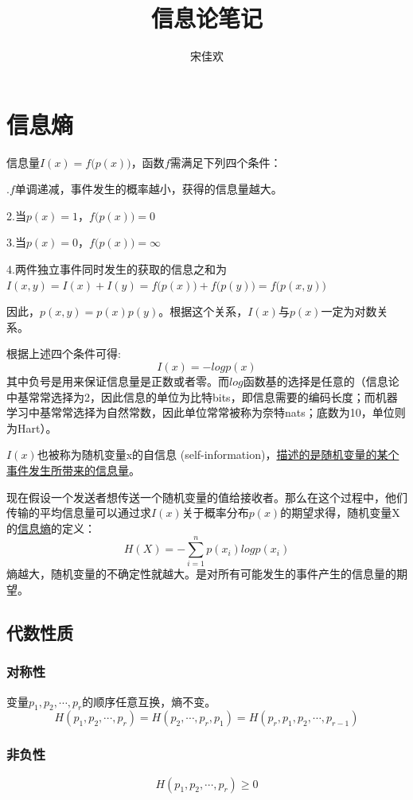 \documentclass[UTF8]{ctexart} %
\title{信息论笔记}
\author{宋佳欢}
\begin{document}
	\maketitle
	\tableofcontents
	\songti {}
	
	\section{信息熵}
		信息量$I(x)=f\big(p(x)\big)$，函数$f$需满足下列四个条件：
		
		.$f$单调递减，事件发生的概率越小，获得的信息量越大。
		
		\quad2.当$p(x)=1$，$f\big(p(x)\big)=0$
		
		\quad3.当$p(x)=0$，$f\big(p(x)\big)=\infty$
		
		\quad4.两件独立事件同时发生的获取的信息之和为$I(x,y)=I(x)+I(y)=f\big(p(x)\big)+f\big(p(y)\big)=f\big(p(x,y)\big)$
		
		因此，$p(x,y)=p(x)p(y)$。根据这个关系，$I(x)$与$p(x)$一定为对数关系。
		
		根据上述四个条件可得:\[I(x)=-logp(x)\]
		其中负号是用来保证信息量是正数或者零。而$log$函数基的选择是任意的（信息论中基常常选择为2，因此信息的单位为比特bits，即信息需要的编码长度；而机器学习中基常常选择为自然常数，因此单位常常被称为奈特nats；底数为10，单位则为Hart）。
		
		$I(x)$也被称为随机变量x的自信息 (self-information)，\uline{描述的是随机变量的某个事件发生所带来的信息量}。
		
		现在假设一个发送者想传送一个随机变量的值给接收者。那么在这个过程中，他们传输的平均信息量可以通过求$I(x)$关于概率分布$p(x)$的期望求得，随机变量X的\uline{信息熵}的定义：
		\[H(X)= -\sum_{i=1}^np(x_i)logp(x_i)\]
		熵越大，随机变量的不确定性就越大。是对所有可能发生的事件产生的信息量的期望。
		
		\subsection{代数性质}
			\subsubsection{对称性}
				变量$p_1,p_2,\cdots,p_r$的顺序任意互换，熵不变。
				\[H(p_1,p_2,\cdots,p_r) = H(p_2,\cdots,p_r,p_1) = H(p_r,p_1,p_2,\cdots,p_{r-1})\]
			\subsubsection{非负性}
				\[H(p_1,p_2,\cdots,p_r) \geq 0\]
\end{document}
